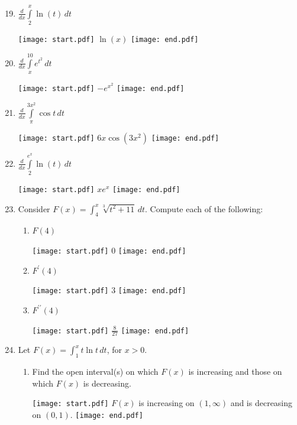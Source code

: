 \documentclass[12pt]{article}
\begin{document}
\begin{enumerate}
\setcounter{enumi}{18}

\item $\frac{d}{dx}\int\limits_{2}^{x} \ln{(t)} \,dt$ 

\texttt{[image: start.pdf]}
{{$\ln{(x)}$}}
\texttt{[image: end.pdf]}


\item $\frac{d}{dx}\int\limits_{x}^{10} e^{t^2} \,dt$ 

\texttt{[image: start.pdf]}
{{$-e^{x^2}$}}
\texttt{[image: end.pdf]}


\item $\frac{d}{dx}\int\limits_{\pi}^{3x^2} \cos{t} \,dt$ 

\texttt{[image: start.pdf]}
{{$6x\cos{\left(3x^2\right)}$}}
\texttt{[image: end.pdf]}


\item $\frac{d}{dx}\int\limits_{2}^{e^x} \ln{(t)} \,dt$ 

\texttt{[image: start.pdf]}
{{$xe^x$}}
\texttt{[image: end.pdf]}


\item Consider $F(x)=\int_4^x{\sqrt[3]{t^2+11}} \,dt$. Compute each of the following:

\begin{enumerate}

\item $F(4)$

\texttt{[image: start.pdf]}
{{$0$}}
\texttt{[image: end.pdf]}


\item $F^{\prime}(4)$

\texttt{[image: start.pdf]}
{{$3$}}
\texttt{[image: end.pdf]}


\item $F^{\prime \prime}(4)$

\texttt{[image: start.pdf]}
{{$\frac{8}{27}$}}
\texttt{[image: end.pdf]}


\end{enumerate}

\item Let $F(x)=\int_1^x t\ln{t} \,dt$, for $x>0$.

\begin{enumerate}

\item Find the open interval(s) on which $F(x)$ is increasing and those on which $F(x)$ is decreasing.

\texttt{[image: start.pdf]}
{{$F(x)$ is increasing on $(1,\infty)$ and is decreasing on $(0,1)$.}}
\texttt{[image: end.pdf]}



\end{enumerate}
\end{enumerate}
\end{document}
